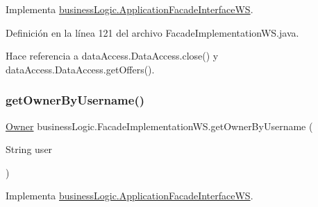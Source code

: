 Implementa \mbox{\hyperlink{interfacebusiness_logic_1_1_application_facade_interface_w_s_ae338a96d039003c64fceb68d667736f1}{business\+Logic.\+Application\+Facade\+Interface\+WS}}.



Definición en la línea 121 del archivo Facade\+Implementation\+W\+S.\+java.


\begin{DoxyCode}{0}

\end{DoxyCode}


Hace referencia a data\+Access.\+Data\+Access.\+close() y data\+Access.\+Data\+Access.\+get\+Offers().

\mbox{\label{classbusiness_logic_1_1_facade_implementation_w_s_a2e7c07eb23b062294ea3f5aaa48285a5}} 
\subsubsection{\texorpdfstring{getOwnerByUsername()}{getOwnerByUsername()}}
{\footnotesize\ttfamily \mbox{\hyperlink{classdomain_1_1_owner}{Owner}} business\+Logic.\+Facade\+Implementation\+W\+S.\+get\+Owner\+By\+Username (\begin{DoxyParamCaption}\item[{String}]{user }\end{DoxyParamCaption})}



Implementa \mbox{\hyperlink{interfacebusiness_logic_1_1_application_facade_interface_w_s_a0f38b3b41794e2ec57b019b89ef255c3}{business\+Logic.\+Application\+Facade\+Interface\+WS}}.



